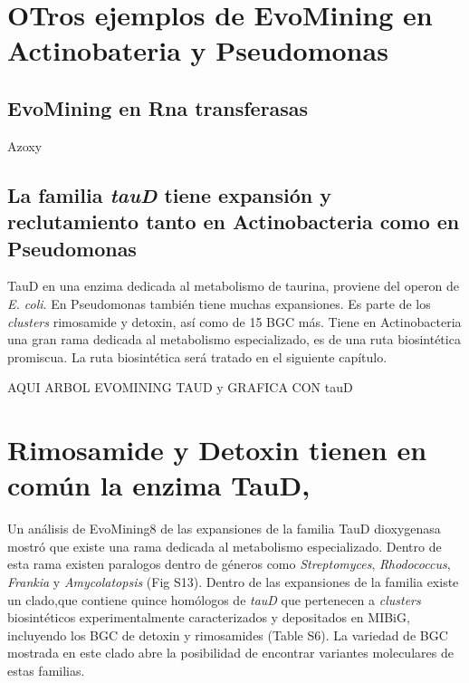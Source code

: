\documentclass[12pt,twoside]{reedthesis}
\begin{document}
  \section{OTros ejemplos de EvoMining en Actinobateria y
  Pseudomonas}\label{otros-ejemplos-de-evomining-en-actinobateria-y-pseudomonas}
  
  \subsection{EvoMining en Rna
  transferasas}\label{evomining-en-rna-transferasas}
  
  Azoxy
  
  \subsection{\texorpdfstring{La familia \emph{tauD} tiene expansión y
  reclutamiento tanto en Actinobacteria como en
  Pseudomonas}{La familia tauD tiene expansión y reclutamiento tanto en Actinobacteria como en Pseudomonas}}\label{la-familia-taud-tiene-expansion-y-reclutamiento-tanto-en-actinobacteria-como-en-pseudomonas}
  
  TauD en una enzima dedicada al metabolismo de taurina, proviene del
  operon de \emph{E. coli}. En Pseudomonas también tiene muchas
  expansiones. Es parte de los \emph{clusters} rimosamide y detoxin, así
  como de 15 BGC más. Tiene en Actinobacteria una gran rama dedicada al
  metabolismo especializado, es de una ruta biosintética promiscua. La
  ruta biosintética será tratado en el siguiente capítulo.
  
  AQUI ARBOL EVOMINING TAUD y GRAFICA CON tauD
  
  \section{Rimosamide y Detoxin tienen en común la enzima
  TauD,}\label{rimosamide-y-detoxin-tienen-en-comun-la-enzima-taud}
  
  Un análisis de EvoMining8 de las expansiones de la familia TauD
  dioxygenasa mostró que existe una rama dedicada al metabolismo
  especializado. Dentro de esta rama existen paralogos dentro de géneros
  como \emph{Streptomyces}, \emph{Rhodococcus}, \emph{Frankia} y
  \emph{Amycolatopsis} (Fig S13). Dentro de las expansiones de la familia
  existe un clado,que contiene quince homólogos de \emph{tauD} que
  pertenecen a \emph{clusters} biosintéticos experimentalmente
  caracterizados y depositados en MIBiG, incluyendo los BGC de detoxin y
  rimosamides (Table S6). La variedad de BGC mostrada en este clado abre
  la posibilidad de encontrar variantes moleculares de estas familias.
  
\end{document}
